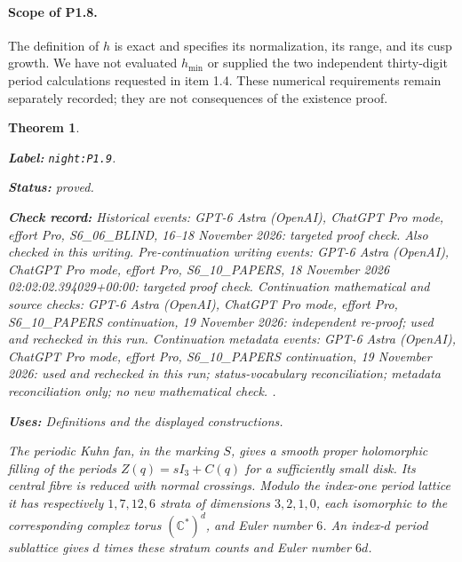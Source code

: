 \documentclass[11pt,a4paper]{article}
\newtheorem{theorem}{Theorem}[section]
\theoremstyle{definition}
\newcommand{\StatementRecord}[4]{\par\smallskip\begingroup\upshape\raggedright\noindent\textbf{Label:} \nolinkurl{#1}.\par\noindent\textbf{Status:} #2.\par\noindent\textbf{Check record:} #3.\par\noindent\textbf{Uses:} #4.\par\endgroup\smallskip}
\begin{document}
\paragraph{Scope of P1.8.}
The definition of $h$ is exact and specifies its normalization, its
range, and its cusp growth.  We have not evaluated $h_{\min}$ or
supplied the two independent thirty-digit period calculations requested
in item 1.4.  These numerical requirements remain separately recorded;
they are not consequences of the existence proof.

\begin{theorem}\label{night:P1.9}
\StatementRecord{night:P1.9}{proved}{Historical events: GPT-6 Astra (OpenAI), ChatGPT Pro mode, effort Pro, S6\_06\_BLIND, 16--18 November 2026: targeted proof check. Also checked in this writing. Pre-continuation writing events: GPT-6 Astra (OpenAI), ChatGPT Pro mode, effort Pro, S6\_10\_PAPERS, 18 November 2026 02:02:02.394029+00:00: targeted proof check. Continuation mathematical and source checks: GPT-6 Astra (OpenAI), ChatGPT Pro mode, effort Pro, S6\_10\_PAPERS continuation, 19 November 2026: independent re-proof; used and rechecked in this run. Continuation metadata events: GPT-6 Astra (OpenAI), ChatGPT Pro mode, effort Pro, S6\_10\_PAPERS continuation, 19 November 2026: used and rechecked in this run; status-vocabulary reconciliation; metadata reconciliation only; no new mathematical check. }{Definitions and the displayed constructions}
The periodic Kuhn fan, in the marking $S$, gives a smooth proper
holomorphic filling of the periods $Z(q)=sI_3+C(q)$ for a sufficiently
small disk.  Its central fibre is reduced with normal crossings.
Modulo the index-one period lattice it has respectively $1,7,12,6$
strata of dimensions $3,2,1,0$, each isomorphic to the corresponding
complex torus $(\mathbb C^*)^d$, and Euler number $6$.
An index-$d$ period sublattice gives $d$ times these stratum counts and
Euler number $6d$.
\end{theorem}
\end{document}
